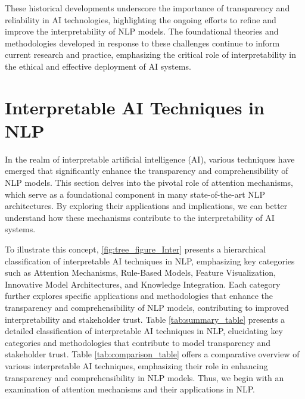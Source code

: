 These historical developments underscore the importance of transparency and reliability in AI technologies, highlighting the ongoing efforts to refine and improve the interpretability of NLP models. The foundational theories and methodologies developed in response to these challenges continue to inform current research and practice, emphasizing the critical role of interpretability in the ethical and effective deployment of AI systems.







\section{Interpretable AI Techniques in NLP} \label{sec:Interpretable AI Techniques in NLP}



In the realm of interpretable artificial intelligence (AI), various techniques have emerged that significantly enhance the transparency and comprehensibility of NLP models. This section delves into the pivotal role of attention mechanisms, which serve as a foundational component in many state-of-the-art NLP architectures. By exploring their applications and implications, we can better understand how these mechanisms contribute to the interpretability of AI systems.

To illustrate this concept, \autoref{fig:tree_figure_Inter} presents a hierarchical classification of interpretable AI techniques in NLP, emphasizing key categories such as Attention Mechanisms, Rule-Based Models, Feature Visualization, Innovative Model Architectures, and Knowledge Integration. Each category further explores specific applications and methodologies that enhance the transparency and comprehensibility of NLP models, contributing to improved interpretability and stakeholder trust. Table \ref{tab:summary_table} presents a detailed classification of interpretable AI techniques in NLP, elucidating key categories and methodologies that contribute to model transparency and stakeholder trust. Table \ref{tab:comparison_table} offers a comparative overview of various interpretable AI techniques, emphasizing their role in enhancing transparency and comprehensibility in NLP models. Thus, we begin with an examination of attention mechanisms and their applications in NLP.











